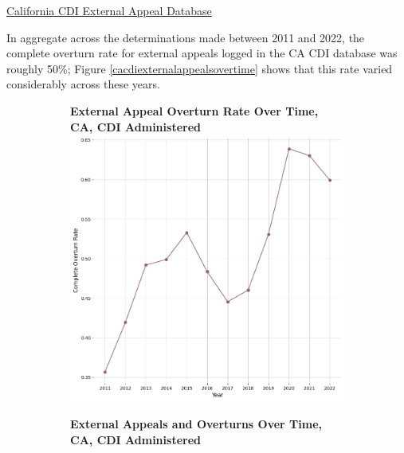 \documentclass[12pt, a4paper,twoside]{report}
\theoremstyle{plain} %
\theoremstyle{definition} %
\theoremstyle{remark} %
\numberwithin{equation}{chapter}
\begin{document}
		\underline{California CDI External Appeal Database}
		
		In aggregate across the determinations made between 2011 and 2022, the complete overturn rate for external appeals logged in the CA CDI database was roughly 50\%; Figure \ref{cacdiexternalappealsovertime} shows that this rate varied considerably across these years.
		
		
		\begin{figure}[h!]
			\centering
			\begin{subfigure}[b]{0.49\textwidth}
				\centering
				\textbf{External Appeal Overturn Rate Over Time, CA, CDI Administered}
				\includegraphics[width=\textwidth]{images/ca_doi_external_appeals/external_appeal_overturn_rates_by_year.png}
			\end{subfigure}
			\hfill
			\begin{subfigure}[b]{0.49\textwidth}
				\centering
				\textbf{External Appeals and Overturns Over Time, CA, CDI Administered}

\end{subfigure}
\end{figure}
\end{document}
